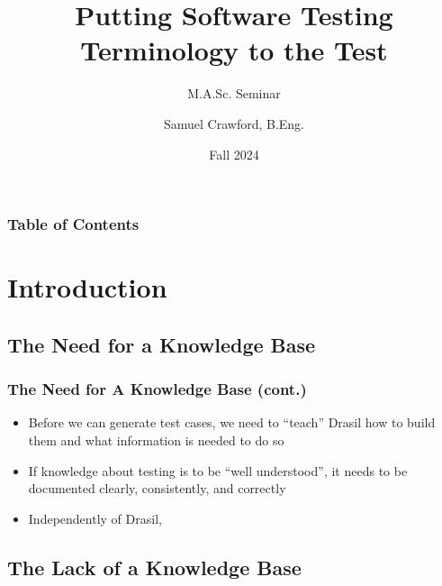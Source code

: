 \documentclass{beamer}
\title[Testing Terminology]{Putting Software Testing Terminology to the Test}
\subtitle{M.A.Sc. Seminar}
\author[Samuel Crawford]{Samuel Crawford, B.Eng.}
\institute[McMaster University]{McMaster University\\Department of Computing and Software}
\date{Fall 2024}
\begin{document}

\frame{\titlepage}


\begin{frame}
    \frametitle{Table of Contents}
    \tableofcontents
\end{frame}

\section{Introduction}

\subsection{The Need for a Knowledge Base}

\begin{frame}
    \frametitle{The Need for A Knowledge Base (cont.)}
    \begin{itemize}
        \item Before we can generate test cases, we need to ``teach'' Drasil
              how to build them and what information is needed to do so
        \item If knowledge about testing is to be ``well understood'', it needs
              to be documented clearly, consistently, and correctly
        \item<2-> Independently of Drasil, \litStd{}
    \end{itemize}
\end{frame}

\subsection{The Lack of a Knowledge Base}
\end{document}
